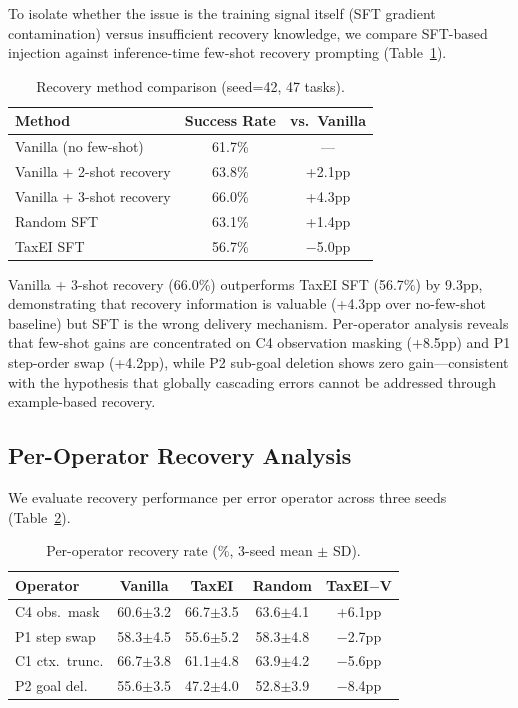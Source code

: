\documentclass[11pt,a4paper]{article}
\begin{document}
To isolate whether the issue is the training signal itself (SFT gradient contamination) versus insufficient recovery knowledge, we compare SFT-based injection against inference-time few-shot recovery prompting (Table~\ref{tab:fewshot}).

\begin{table}[t]
\centering
\small
\begin{tabular}{lcc}
\toprule
\textbf{Method} & \textbf{Success Rate} & \textbf{vs.\ Vanilla} \\
\midrule
Vanilla (no few-shot)     & 61.7\% & --- \\
Vanilla + 2-shot recovery & 63.8\% & +2.1pp \\
Vanilla + 3-shot recovery & 66.0\% & +4.3pp \\
Random SFT                & 63.1\% & +1.4pp \\
TaxEI SFT                 & 56.7\% & $-$5.0pp \\
\bottomrule
\end{tabular}
\caption{Recovery method comparison (seed=42, 47 tasks).}
\label{tab:fewshot}
\end{table}

Vanilla + 3-shot recovery (66.0\%) outperforms TaxEI SFT (56.7\%) by 9.3pp, demonstrating that recovery information is valuable (+4.3pp over no-few-shot baseline) but SFT is the wrong delivery mechanism. Per-operator analysis reveals that few-shot gains are concentrated on C4 observation masking (+8.5pp) and P1 step-order swap (+4.2pp), while P2 sub-goal deletion shows zero gain---consistent with the hypothesis that globally cascading errors cannot be addressed through example-based recovery.

\subsection{Per-Operator Recovery Analysis}
\label{sec:peroperator}

We evaluate recovery performance per error operator across three seeds (Table~\ref{tab:peroperator}).

\begin{table}[t]
\centering
\small
\begin{tabular}{lcccc}
\toprule
\textbf{Operator} & \textbf{Vanilla} & \textbf{TaxEI} & \textbf{Random} & \textbf{TaxEI$-$V} \\
\midrule
C4 obs.\ mask  & 60.6\scriptsize{$\pm$3.2} & 66.7\scriptsize{$\pm$3.5} & 63.6\scriptsize{$\pm$4.1} & +6.1pp \\
P1 step swap   & 58.3\scriptsize{$\pm$4.5} & 55.6\scriptsize{$\pm$5.2} & 58.3\scriptsize{$\pm$4.8} & $-$2.7pp \\
C1 ctx.\ trunc.& 66.7\scriptsize{$\pm$3.8} & 61.1\scriptsize{$\pm$4.8} & 63.9\scriptsize{$\pm$4.2} & $-$5.6pp \\
P2 goal del.   & 55.6\scriptsize{$\pm$3.5} & 47.2\scriptsize{$\pm$4.0} & 52.8\scriptsize{$\pm$3.9} & $-$8.4pp \\
\bottomrule
\end{tabular}
\caption{Per-operator recovery rate (\%, 3-seed mean $\pm$ SD).}
\label{tab:peroperator}
\end{table}
\end{document}
